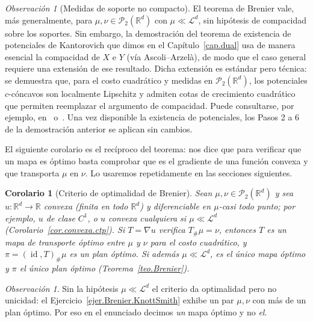 \documentclass[12pt, a4paper]{amsbook}
\newcommand{\id}{\operatorname{id}}
\newcommand{\R}{{\mathbb R}}
\newtheorem{cor}[teo]{Corolario}
\theoremstyle{remark}
\newtheorem{obs}[teo]{Observación}
\theoremstyle{definition}
\numberwithin{section}{chapter}
\numberwithin{subsection}{section}
\numberwithin{equation}{section}
\numberwithin{figure}{chapter}
\begin{document}
\begin{obs}[Medidas de soporte no compacto]\label{obs.soporte.no.compacto}
El teorema de Brenier vale, más generalmente, para $\mu,\nu\in\mathcal P_2(\R^d)$
con $\mu\ll\mathcal L^d$, sin hipótesis de compacidad sobre los soportes.
Sin embargo, la demostración del teorema de existencia de potenciales de
Kantorovich que dimos en el Capítulo~\ref{cap.dual} usa de manera esencial la
compacidad de $X$ e $Y$ (vía Ascoli--Arzelà), de modo que el caso general
requiere una extensión de ese resultado. Dicha extensión es estándar pero
técnica: se demuestra que, para el costo cuadrático y medidas en
$\mathcal P_2(\R^d)$, los potenciales $c$-cóncavos son localmente Lipschitz y
admiten cotas de crecimiento cuadrático que permiten reemplazar el argumento
de compacidad. Puede consultarse, por ejemplo,
en~\cite{Villani2003} o~\cite{Santambrogio}. Una vez disponible la
existencia de potenciales, los Pasos 2 a 6 de la demostración anterior se
aplican sin cambios.
\end{obs}

El siguiente corolario es el recíproco del teorema: nos dice que para
verificar que un mapa es óptimo basta comprobar que es el gradiente de una
función convexa y que transporta $\mu$ en $\nu$. Lo usaremos repetidamente en
las secciones siguientes.

\begin{cor}[Criterio de optimalidad de Brenier]\label{cor.criterio.Brenier}
Sean $\mu,\nu\in\mathcal P_2(\R^d)$ y sea $u\colon\R^d\to\R$ convexa (finita
en todo $\R^d$) y diferenciable en $\mu$-casi todo punto; por ejemplo, $u$ de
clase $C^1$, o $u$ convexa cualquiera si $\mu\ll\mathcal L^d$
(Corolario~\ref{cor.convexa.ctp}). Si $T=\nabla u$ verifica $T_\#\mu=\nu$,
entonces $T$ es un mapa de transporte óptimo entre $\mu$ y $\nu$ para el
costo cuadrático, y $\pi=(\id,T)_\#\mu$ es un plan óptimo. Si además
$\mu\ll\mathcal L^d$, es el único mapa óptimo y $\pi$ el único plan óptimo
(Teorema~\ref{teo.Brenier}).
\end{cor}

\begin{obs}
Sin la hipótesis $\mu\ll\mathcal L^d$ el criterio da optimalidad pero no
unicidad: el Ejercicio~\ref{ejer.Brenier.KnottSmith} exhibe un par $\mu,\nu$
con más de un plan óptimo. Por eso en el enunciado decimos \emph{un} mapa
óptimo y no \emph{el}.
\end{obs}
\end{document}
